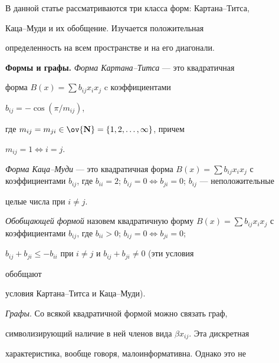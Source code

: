 \label{begin} 


 


 


 


В данной статье рассматриваются три класса форм: Картана--Титса, 


Каца--Муди и их обобщение. Изучается положительная 


определенность на всем пространстве и на его диагонали. 


\medskip 


 


{\bf Формы и графы.} {\it Форма Картана--Титса} --- это квадратичная 


форма $B(x)=\sum b_{ij}x_i x_j$ c коэффициентами 


$b_{ij}=-\cos(\pi/m_{ij})$, 


где $m_{ij}=m_{ji}\in\ov{\bold N}=\{1,2,\dotsc,\infty\}$, причем 


$m_{ij}=1\Leftrightarrow i=j$. 


 


{\it Форма Каца--Муди} --- это квадратичная форма $B(x)=\sum b_{ij}x_i 


x_j$ с коэффициентами $b_{ij}$, где $b_{ii}=2$; $b_{ij}=0\Leftrightarrow 


b_{ji}=0$; $b_{ij}$ --- неположительные 


целые числа при $i\ne j$. 


 


{\it Обобщающей формой} назовем квадратичную форму $B(x)=\sum b_{ij} x_i 


x_j$ с коэффициентами $b_{ij}$, где $b_{ii}>0$; $b_{ij}=0\Leftrightarrow 


b_{ji}=0$; 


$b_{ij}+b_{ji}\le -b_{ii}$ при $i\ne j$ и $b_{ij}+b_{ji}\ne0$ (эти условия 


обобщают 


условия Картана--Титса и Каца--Муди). 


 


{\it Графы}. Со всякой квадратичной формой можно связать граф, 


символизирующий наличие в ней членов вида $\beta x_{ij}$. Эта дискретная 


характеристика, вообще говоря, малоинформативна. Однако это не 


